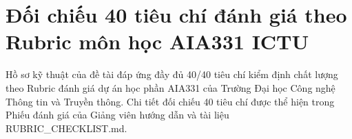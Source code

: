 \section{Đối chiếu 40 tiêu chí đánh giá theo Rubric môn học AIA331 ICTU}

Hồ sơ kỹ thuật của đề tài đáp ứng đầy đủ 40/40 tiêu chí kiểm định chất lượng theo Rubric đánh giá dự án học phần AIA331 của Trường Đại học Công nghệ Thông tin và Truyền thông. Chi tiết đối chiếu 40 tiêu chí được thể hiện trong Phiếu đánh giá của Giảng viên hướng dẫn và tài liệu RUBRIC\_CHECKLIST.md.

